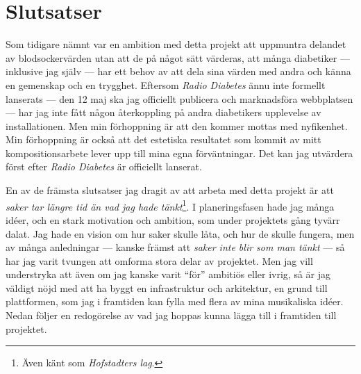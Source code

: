 \documentclass[11pt, a4paper]{article} %
\begin{document}
\section*{Slutsatser}
Som tidigare nämnt var en ambition med detta projekt att uppmuntra delandet av blodsockervärden utan att de på något sätt värderas, att många diabetiker --- inklusive jag själv --- har ett behov av att dela sina värden med andra och känna en gemenskap och en trygghet. Eftersom \emph{Radio Diabetes} ännu inte formellt lanserats --- den 12 maj ska jag officiellt publicera och marknadsföra webbplatsen --- har jag inte fått någon återkoppling på andra diabetikers upplevelse av installationen. Men min förhoppning är att den kommer mottas med nyfikenhet. Min förhoppning är också att det estetiska resultatet som kommit av mitt kompositionsarbete lever upp till mina egna förväntningar. Det kan jag utvärdera först efter \emph{Radio Diabetes} är officiellt lanserat.

En av de främsta slutsatser jag dragit av att arbeta med detta projekt är att \emph{saker tar längre tid än vad jag hade tänkt}\footnote{Även känt som \emph{Hofstadters lag}.}. I planeringsfasen hade jag många idéer, och en stark motivation och ambition, som under projektets gång tyvärr dalat. Jag hade en vision om hur saker skulle låta, och hur de skulle fungera, men av många anledningar --- kanske främst att \emph{saker inte blir som man tänkt} --- så har jag varit tvungen att omforma stora delar av projektet. Men jag vill understryka att även om jag kanske varit ``för'' ambitiös eller ivrig, så är jag väldigt nöjd med att ha byggt en infrastruktur och arkitektur, en grund till plattformen, som jag i framtiden kan fylla med flera av mina musikaliska idéer. Nedan följer en redogörelse av vad jag hoppas kunna lägga till i framtiden till projektet.
\end{document}
